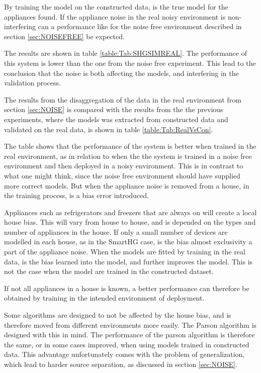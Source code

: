 By training the model on the constructed data, is the true model for the appliances found. If the appliance noise in the real noisy environment is non-interfering can a performance like for the noise free environment described in section \ref{sec:NOISEFREE} be expected. 




The results are shown in table \ref{table:Tab:SHGSIMREAL}. The performance of this system is lower than the one from the noise free experiment. This lead to the conclusion that the noise is both affecting the models, and interfering in the validation process.  

The results from the disaggregation of the data in the real environment from section \ref{sec:NOISE} is compared with the results from the the previous experiments, where the models was extracted from constructed data and validated on the real data, is shown in table \ref{table:Tab:RealVsCon}. 



The table shows that the performance of the system is better when trained in the real environment, as in relation to when the the system is trained in a noise free environment and then deployed in a noisy environment. This is in contrast to what one might think, since the noise free environment should have supplied more correct models. But when the appliance noise is removed from a house, in the training process, is a bias error introduced. 

Appliances such as refrigerators and freezers that are always on will create a local house bias. This will vary from house to house, and is depended on the types and number of appliances in the house. If only a small number of devices are modelled in each house, as in the SmartHG case, is the bias almost exclusivity a part of the appliance noise. When the models are fitted by training in the real data, is the bias learned into the model, and further improves the model. This is not the case when the model are trained in the constructed dataset. 

If not all appliances in a house is known, a better performance can therefore be obtained by training in the intended environment of deployment. 

Some algorithms are designed to not be affected by the house bias, and is therefore moved from different environments more easily. The Parson algorithm is designed with this in mind. The performance of the parson algorithm is therefore the same, or in some cases improved, when using models trained in constructed data. This advantage unfortunately comes with the problem of generalization, which lead to harder source separation, as discussed in section \ref{sec:NOISE}. 


